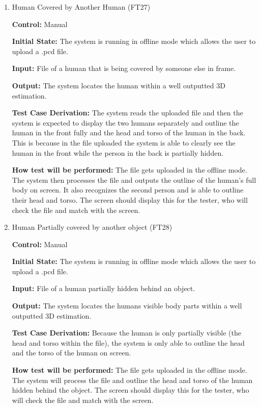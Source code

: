 \documentclass[12pt, titlepage]{article}
\begin{document}
\begin{enumerate}
  \item{Human Covered by Another Human (FT27)\\}

  \textbf{Control:} Manual

  \textbf{Initial State:} The system is running in offline mode which allows the user to upload a .pcd file.
  
  \textbf{Input:} File of a human that is being covered by someone else in frame.
  
  \textbf{Output:} The system locates the human within a well outputted 3D estimation.
  
  \textbf{Test Case Derivation:} The system reads the uploaded file and then the system is expected to display the two humans separately and outline the human in the front fully and the head and torso of the human in the back. This is because in the file uploaded the system is able to clearly see the human in the front while the person in the back is partially hidden.
  
  \textbf{How test will be performed:}  The file gets uploaded in the offline mode. The system then processes the file and outputs the outline of the human's full body on screen. It also recognizes the second person and is able to outline their head and torso. The screen should display this for the tester, who will check the file and match with the screen.

  \item{Human Partially covered by another object (FT28)\\}

  \textbf{Control:} Manual

  \textbf{Initial State:} The system is running in offline mode which allows the user to upload a .pcd file.

  \textbf{Input:} File of a human partially hidden behind an object.

  \textbf{Output:} The system locates the humans visible body parts within a well outputted 3D estimation.

  \textbf{Test Case Derivation:} Because the human is only partially visible (the  head and torso within the file), the system is only able to outline the head and the torso of the human on screen.

  \textbf{How test will be performed:} The file gets uploaded in the offline mode. The system will process the file and outline the head and torso of the human hidden behind the object. The screen should display this for the tester, who will check the file and match with the screen.

  
  
\end{enumerate}
\end{document}
